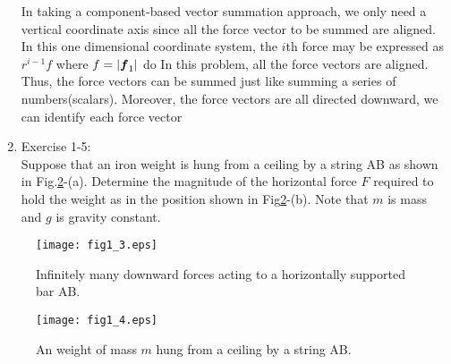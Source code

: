 \documentclass[10pt,a4j]{article}
\begin{document}
\begin{enumerate}
	{\small 
		In taking a component-based vector summation approach, we only need a vertical 
		coordinate axis since all the force vector to be summed are aligned.  
		In this one dimensional coordinate system, the $i$th force may be 
		 expressed as $r^{i-1}f$ where $f=|\mbox{\boldmath $f$}_1|$
		do
		In this problem, all the force vectors are aligned. 
		Thus, the force vectors can be summed just like summing a series of numbers(scalars). 
		Moreover, the force vectors are all directed downward, we can identify each 
		force vector 
	}
\item
Exercise 1-5:\\
	Suppose that an iron weight is hung from a ceiling by a string AB as shown in Fig.\ref{fig:fig1_4}-(a). 
	Determine the magnitude of the horizontal force $F$ required to hold the weight as 
	in the position shown in Fig\ref{fig:fig1_4}-(b).
	Note that $m$ is mass and $g$ is gravity constant.  
\end{enumerate}
\begin{figure}[h]
	\begin{center}
	\texttt{[image: fig1\_3.eps]} 
	\end{center}
	\caption{Infinitely many downward forces acting to a horizontally supported bar AB.}
	\label{fig:fig1_3}
\end{figure}
\begin{figure}[h]
	\begin{center}
	\texttt{[image: fig1\_4.eps]} 
	\end{center}
	\caption{An weight of mass $m$ hung from a ceiling by a string AB.} 
	\label{fig:fig1_4}
\end{figure}
\end{document}
